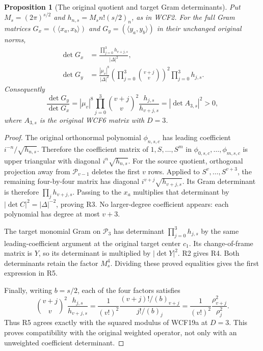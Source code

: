 \documentclass[11pt]{article}
\newtheorem{proposition}{Proposition}
\newcommand{\cP}{\mathcal P}
\begin{document}
\begin{proposition}[The original quotient and target Gram determinants]
Put $M_s=(2\pi)^{s/2}$ and $h_{n,s}=M_s n!(s/2)_n$, as in WCF2.
For the full Gram matrices $G_x=(\langle x_a,x_b\rangle)$ and
$G_y=(\langle y_a,y_b\rangle)$ in their unchanged original norms,
\begin{align}
 \det G_x&=\frac{\prod_{j=0}^3h_{v+j,s}}{|\Delta|^2},\tag{R3}\\
 \det G_y&=\frac{|\mu_v|^8}{|\Delta|^2}
     \left(\prod_{j=0}^3\binom{v+j}{v}\right)^2
     \prod_{j=0}^3h_{j,s}.\tag{R4}
\end{align}
Consequently
\begin{equation}
 \frac{\det G_y}{\det G_x}
 =|\mu_v|^8\prod_{j=0}^3
       \binom{v+j}{v}^{\!2}\frac{h_{j,s}}{h_{v+j,s}}
 =|\det A_{3,s}|^2>0,\tag{R5}
\end{equation}
where $A_{3,s}$ is the original WCF6 matrix with $D=3$.
\end{proposition}
\begin{proof}
The original orthonormal polynomial $\phi_{n,s,c}$ has leading
coefficient $i^{-n}/\sqrt{h_{n,s}}$. Therefore the coefficient matrix
of $1,S,\ldots,S^m$ in $\phi_{0,s,c},\ldots,\phi_{m,s,c}$ is
upper triangular with diagonal $i^n\sqrt{h_{n,s}}$.
For the source quotient, orthogonal projection away from
$\cP_{v-1}$ deletes the first $v$ rows. Applied to
$S^v,\ldots,S^{v+3}$, the remaining four-by-four matrix has diagonal
$i^{v+j}\sqrt{h_{v+j,s}}$. Its Gram determinant is therefore
$\prod_jh_{v+j,s}$. Passing to the $x_a$ multiplies that determinant
by $|\det C|^2=|\Delta|^{-2}$, proving R3. No larger-degree
coefficient appears: each polynomial has degree at most $v+3$.

The target monomial Gram on $\cP_3$ has determinant
$\prod_{j=0}^3h_{j,s}$ by the same leading-coefficient argument at
the original target center $c_1$. Its change-of-frame matrix is
$Y$, so its determinant is multiplied by $|\det Y|^2$. R2 gives
R4. Both determinants retain the factor $M_s^4$. Dividing these
proved equalities gives the first expression in R5.

Finally, writing $b=s/2$, each of the four factors satisfies
\[
 \binom{v+j}{v}^{\!2}\frac{h_{j,s}}{h_{v+j,s}}
 =\frac{1}{(v!)^2}\frac{(v+j)!/(b)_{v+j}}{j!/(b)_j}
 =\frac{1}{(v!)^2}\frac{\rho_{v+j}^2}{\rho_j^2}.
\]
Thus R5 agrees exactly with the squared modulus of WCF19a at $D=3$.
This proves compatibility with the original weighted operator, not
only with an unweighted coefficient determinant.
\end{proof}
\end{document}
